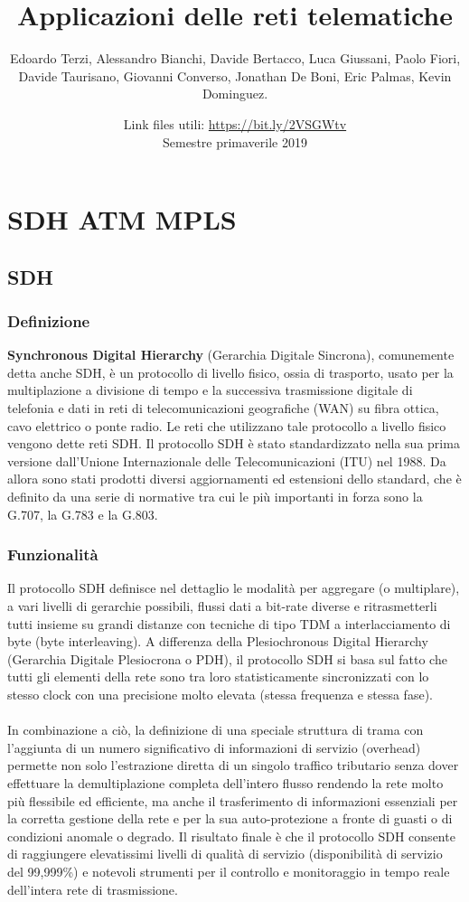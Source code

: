 \documentclass[8pt]{extarticle}
\title{\Huge Applicazioni delle reti telematiche \vspace{1cm}}
\author{Edoardo Terzi, Alessandro Bianchi, Davide Bertacco, Luca Giussani, Paolo Fiori, \\
Davide Taurisano, Giovanni Converso, Jonathan De Boni, Eric Palmas, Kevin Dominguez.\vspace{0.5cm}}
\date{Link files utili: \url{https://bit.ly/2VSGWtv} \\ Semestre primaverile 2019}
\begin{document}
\maketitle
\thispagestyle{empty}
\pagebreak

\tableofcontents
\lstset{language=C++}
\pagebreak

\section{SDH ATM MPLS}
\subsection{SDH}
\subsubsection{Definizione}
\noindent
\textbf{Synchronous Digital Hierarchy} (Gerarchia Digitale Sincrona), comunemente detta anche SDH, è un 
protocollo di livello fisico, ossia di trasporto, usato per la multiplazione a divisione di tempo e la 
successiva trasmissione digitale di telefonia e dati in reti di telecomunicazioni geografiche (WAN) su 
fibra ottica, cavo elettrico o ponte radio. Le reti che utilizzano tale protocollo a livello fisico 
vengono dette reti SDH. Il protocollo SDH è stato standardizzato nella sua prima versione dall'Unione 
Internazionale delle Telecomunicazioni (ITU) nel 1988. Da allora sono stati prodotti diversi aggiornamenti 
ed estensioni dello standard, che è definito da una serie di normative tra cui le più importanti in forza 
sono la G.707, la G.783 e la G.803.
\subsubsection{Funzionalità}
\noindent
Il protocollo SDH definisce nel dettaglio le modalità per aggregare (o multiplare), a vari livelli di 
gerarchie possibili, flussi dati a bit-rate diverse e ritrasmetterli tutti insieme su grandi distanze 
con tecniche di tipo TDM a interlacciamento di byte (byte interleaving). A differenza della Plesiochronous 
Digital Hierarchy (Gerarchia Digitale Plesiocrona o PDH), il protocollo SDH si basa sul fatto che tutti 
gli elementi della rete sono tra loro statisticamente sincronizzati con lo stesso clock con una precisione 
molto elevata (stessa frequenza e stessa fase).\\\\
In combinazione a ciò, la definizione di una speciale struttura di trama con l'aggiunta di un numero 
significativo di informazioni di servizio (overhead) permette non solo l'estrazione diretta di un singolo 
traffico tributario senza dover effettuare la demultiplazione completa dell'intero flusso rendendo la 
rete molto più flessibile ed efficiente, ma anche il trasferimento di informazioni essenziali per la 
corretta gestione della rete e per la sua auto-protezione a fronte di guasti o di condizioni anomale o 
degrado. Il risultato finale è che il protocollo SDH consente di raggiungere elevatissimi livelli di 
qualità di servizio (disponibilità di servizio del 99,999\%) e notevoli strumenti per il controllo e 
monitoraggio in tempo reale dell'intera rete di trasmissione.
\end{document}

